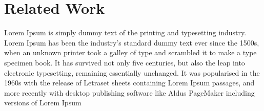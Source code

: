 \documentclass[conference]{IEEEtran}
\begin{document}
\section{Related Work}
Lorem Ipsum is simply dummy text of the printing and typesetting industry. Lorem Ipsum has been the industry's standard dummy text ever since the 1500s, when an unknown printer took a galley of type and scrambled it to make a type specimen book. It has survived not only five centuries, but also the leap into electronic typesetting, remaining essentially unchanged. It was popularised in the 1960s with the release of Letraset sheets containing Lorem Ipsum passages, and more recently with desktop publishing software like Aldus PageMaker including versions of Lorem Ipsum



\end{document}
